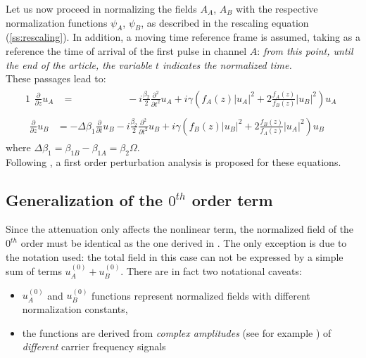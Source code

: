 \documentclass[10pt, lettersize, journal, onecolumn]{IEEEtran}
\begin{document}
Let us now proceed in normalizing the fields $A_A$, $A_B$ with the respective normalization functions $\psi_A$, $\psi_B$, as described in the rescaling equation (\ref{ss:rescaling}).
In addition, a moving time reference frame is assumed, taking as a reference the time of arrival of the first pulse in channel $A$: \textit{from this point, until the end of the article, the variable $t$ indicates the normalized time.}\\
These passages lead to:
\begin{alignat}{1}\label{eq:u}
	\begin{aligned}
		\frac{\partial}{\partial z} u_A &= \qquad \qquad \quad \; - i \frac{\beta_2}{2} \frac{\partial^2}{\partial t^2} u_A + i \gamma \left(f_A(z)|u_A|^2 + 2 \frac{f_A(z)}{f_B(z)} |u_B|^2 \right)u_A
	\end{aligned}\\
	\begin{aligned}
		\frac{\partial}{\partial z} u_B &= - \Delta \beta_1 \frac{\partial}{\partial t} u_B - i \frac{\beta_2}{2} \frac{\partial^2}{\partial t^2} u_B + i \gamma \left(f_B(z)|u_B|^2 +2 \frac{f_B(z)}{f_A(z)}|u_A|^2\right)u_B
	\end{aligned}
\end{alignat}
where $\Delta \beta_1 = \beta_{1B} - \beta_{1A} = \beta_2 \Omega$. \\
Following \cite{Dar_2013}, a first order perturbation analysis is proposed for these equations.

\subsection{Generalization of the $0^{th}$ order term}
Since the attenuation only affects the nonlinear term, the normalized field of the $0^{th}$ order must be identical as the one derived in \cite[eq. 1]{Dar_2013}. The only exception is due to the notation used: the total field in this case can not be expressed by a simple sum of terms $u_A^{(0)}+u_B^{(0)}$. There are in fact two notational caveats:
\begin{itemize}
 \item $u_A^{(0)}$ and $u_B^{(0)}$ functions represent normalized fields with different normalization constants,
 \item the functions are derived from \textit{complex amplitudes} (see for example \cite[pp. 523-525]{Someda}) of \textit{different} carrier frequency signals
\end{itemize}
\end{document}
